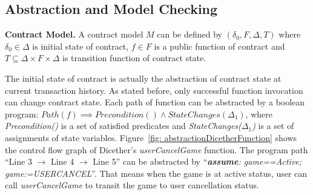 


\subsection{Abstraction and Model Checking}


\begin{definition}
	\label{def: contractmodel}
	\textbf{Contract Model.} 
	A contract model $\mathit{M}$ can be defined by $(\delta_0, F, \Delta, T)$ where $\delta_0 \in \Delta$ is initial state of contract, $f \in  F$ is a public function of contract and $T \subseteq \Delta \times F \times \Delta $ is transition function of contract state.
\end{definition}
The initial state of contract is actually the abstraction of contract state at current transaction history.
As stated before, only successful function invocation can change contract state.
Each path of function can be abstracted by a boolean program: $Path(f)\implies Precondition() \land StateChanges(\Delta_1)$,  where \textit{Precondition()} is a set of satisfied predicates and \textit{StateChanges($\Delta_1$)} is a set of assignments of state variables.
Figure~\ref{fig: abstractionDicetherFunction} shows the control flow graph of Dicether's \textit{userCancelGame} function.
The program path ``Line 3 $\rightarrow$ Line 4 $\rightarrow$ Line 5'' can be abstracted by ``\textit{\textbf{assume}: game==Active; game:=USERCANCEL}''.
That means when the game is at active status, user can call \textit{userCancelGame} to transit the game to user cancellation status.

